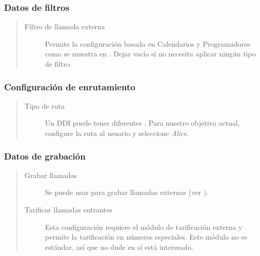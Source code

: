 \documentclass[letterpaper,10pt,spanish]{sphinxmanual}
\begin{document}
\subsubsection{Datos de filtros}
\label{administration_portal/client/vpbx/ddis:filters-data}\begin{quote}
\begin{description}
\item[{Filtro de llamada externa}] \leavevmode
Permite la configuración basada en Calendarios y Programadores como se muestra en {\hyperref[administration_portal/client/vpbx/routing_tools/external_call_filters:external\string-call\string-filters]{}}. Dejar vacío si no necesita aplicar ningún tipo de filtro.

\end{description}
\end{quote}


\subsubsection{Configuración de enrutamiento}
\label{administration_portal/client/vpbx/ddis:routing-configuration}\begin{quote}
\begin{description}
\item[{Tipo de ruta}] \leavevmode
Un DDI puede tener diferentes {\hyperref[administration_portal/client/vpbx/ddis:routing\string-logics]{}}. Para nuestro objetivo actual, configure la ruta al usuario y seleccione \emph{Alice}.

\end{description}
\end{quote}


\subsubsection{Datos de grabación}
\label{administration_portal/client/vpbx/ddis:recording-data}\begin{quote}
\begin{description}
\item[{Grabar llamadas}] \leavevmode
Se puede usar para grabar llamadas externas (ver {\hyperref[administration_portal/client/vpbx/calls/call_recordings:call\string-recordings]{}}).

\item[{Tarificar llamadas entrantes}] \leavevmode
Esta configuración requiere el módulo de tarificación externa y permite la tarificación en números especiales. Este módulo no es estándar, así que no dude en {\hyperref[basic_concepts/intro/getting_help:getting\string-help]{}} si está interesado.

\end{description}
\end{quote}
\end{document}
